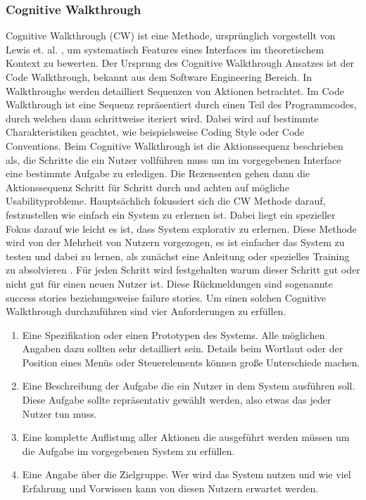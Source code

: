 \documentclass[draft=false
              ,paper=a4
              ,twoside=false
              ,fontsize=11pt
              ,headsepline
              ,BCOR10mm
              ,DIV11
              ]{scrbook}
\begin{document}
\subsubsection{Cognitive Walkthrough} %
\label{ssub:cognitive_walkthrough}
Cognitive Walkthrough (CW) ist eine Methode, ursprünglich vorgestellt von Lewis et. al. \cite{lewis_testing_1990}, um systematisch Features eines Interfaces im theoretischem Kontext zu bewerten. Der Ursprung des Cognitive Walkthrough Ansatzes ist der Code Walkthrough, bekannt aus dem Software Engineering Bereich. In Walkthroughs werden detailliert Sequenzen von Aktionen betrachtet. Im Code Walkthrough ist eine Sequenz repräsentiert durch einen Teil des Programmcodes, durch welchen dann schrittweise iteriert wird. Dabei wird auf bestimmte Charakteristiken geachtet, wie beispielsweise Coding Style oder Code Conventions. Beim Cognitive Walkthrough ist die Aktionssequenz beschrieben als, die Schritte die ein Nutzer vollführen muss um im vorgegebenen Interface eine bestimmte Aufgabe zu erledigen. Die Rezensenten gehen dann die Aktionssequenz Schritt für Schritt durch und achten auf mögliche Usabilityprobleme. Hauptsächlich fokussiert sich die CW Methode darauf, festzustellen wie einfach ein System zu erlernen ist. Dabei liegt ein spezieller Fokus darauf wie leicht es ist, dass System explorativ zu erlernen. Diese Methode wird von der Mehrheit von Nutzern vorgezogen, es ist einfacher das System zu testen und dabei zu lernen, als zunächst eine Anleitung oder spezielles Training zu absolvieren \cite{franzke1994exploration}. Für jeden Schritt wird festgehalten warum dieser Schritt gut oder nicht gut für einen neuen Nutzer ist. Diese Rückmeldungen sind sogenannte \grqq success stories\grqq{} beziehungsweise \grqq failure stories\grqq. Um einen solchen Cognitive Walkthrough durchzuführen sind vier Anforderungen zu erfüllen.

\begin{enumerate}
  \item Eine Spezifikation oder einen Prototypen des Systems. Alle möglichen Angaben dazu sollten sehr detailliert sein. Details beim Wortlaut oder der Position eines Menüs oder Steuerelements können große Unterschiede machen. 
  \item Eine Beschreibung der Aufgabe die ein Nutzer in dem System ausführen soll. Diese Aufgabe sollte repräsentativ gewählt werden, also etwas das jeder Nutzer tun muss.
  \item Eine komplette Auflistung aller Aktionen die ausgeführt werden müssen um die Aufgabe im vorgegebenen System zu erfüllen.
  \item Eine Angabe über die Zielgruppe. Wer wird das System nutzen und wie viel Erfahrung und Vorwissen kann von diesen Nutzern erwartet werden. 
\end{enumerate}
\end{document}
